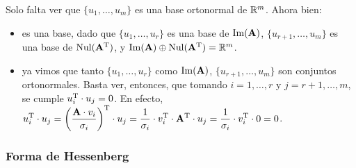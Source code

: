 \begin{enumerate}[label=(\roman*)]
    Solo falta ver que $\lbrace u_1, \dots, u_m \rbrace$ es una base
    ortonormal de $\mathbb{R}^m$. Ahora bien:
    \begin{itemize}
    \item es una base, dado que $\lbrace u_1, \dots, u_r \rbrace$ es una base de
        $\operatorname{Im}(\mathbf{A})$, $\lbrace u_{r+1},\dots,u_m \rbrace$ es una base de
        $\operatorname{Nul}(\mathbf{A}^{\mathrm{T}})$, y $\operatorname{Im}(\mathbf{A}) \oplus \operatorname{Nul}(\mathbf{A}^{\mathrm{T}}) =
        \mathbb{R}^m$.
    \item ya vimos que tanto $\lbrace u_1, \dots, u_r \rbrace$ como
        $\operatorname{Im}(\mathbf{A})$, $\lbrace u_{r+1},\dots,u_m \rbrace$ son conjuntos
        ortonormales. Basta ver, entonces, que tomando $i = 1,\dots,r$ y
        $j = r+1,\dots,m$, se cumple $u_i^{\mathrm{T}} \cdot u_j = 0$. En efecto,
        $\displaystyle u_i^{\mathrm{T}} \cdot u_j
            = \left( \frac{\mathbf{A} \cdot v_i}{\sigma_i} \right)^{\mathrm{T}} \cdot u_j
            = \frac{1}{\sigma_i} \cdot v_i^{\mathrm{T}} \cdot \mathbf{A}^{\mathrm{T}} \cdot u_j
            = \frac{1}{\sigma_i} \cdot v_i^{\mathrm{T}} \cdot 0
            = 0$.

    \end{itemize}

\end{enumerate}




\subsubsection{Forma de Hessenberg}

